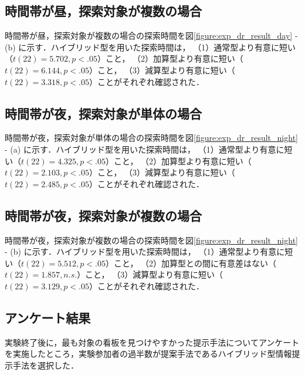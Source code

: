   \subsection{時間帯が昼，探索対象が複数の場合}
    時間帯が昼，探索対象が複数の場合の探索時間を図\ref{figure:exp_dr_result_day} - (b) に示す．ハイブリッド型を用いた探索時間は，
    （1）通常型より有意に短い（$t(22)=5.702, p<.05$）こと，
    （2）加算型より有意に短い（$t(22)=6.144, p<.05$）こと，
    （3）減算型より有意に短い（$t(22)=3.318, p<.05$）ことがそれぞれ確認された．

  \subsection{時間帯が夜，探索対象が単体の場合}
    時間帯が夜，探索対象が単体の場合の探索時間を図\ref{figure:exp_dr_result_night} - (a) に示す．ハイブリッド型を用いた探索時間は，
    （1）通常型より有意に短い（$t(22)=4.325, p<.05$）こと，
    （2）加算型より有意に短い（$t(22)=2.103, p<.05$）こと，
    （3）減算型より有意に短い（$t(22)=2.485, p<.05$）ことがそれぞれ確認された．

  \subsection{時間帯が夜，探索対象が複数の場合}
    時間帯が夜，探索対象が複数の場合の探索時間を図\ref{figure:exp_dr_result_night} - (b) に示す．ハイブリッド型を用いた探索時間は，
    （1）通常型より有意に短い（$t(22)=5.512, p<.05$）こと，
    （2）加算型との間に有意差はない（$t(22)=1.857, n.s.$）こと，
    （3）減算型より有意に短い（$t(22)=3.129, p<.05$）ことがそれぞれ確認された．

  \subsection{アンケート結果}
    実験終了後に，最も対象の看板を見つけやすかった提示手法についてアンケートを実施したところ，実験参加者の過半数が提案手法であるハイブリッド型情報提示手法を選択した．

